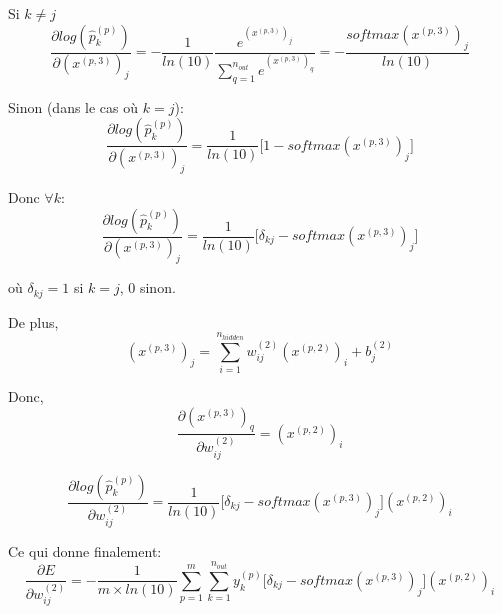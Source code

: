 \documentclass[a4paper,11pt,oneside,roman]{article}
\begin{document}
    Si $k \ne j$
    \begin{equation}
        \frac{\partial log(\hat{p}_{k}^{(p)})}{\partial (x^{(p,3)})_{j}} = -\frac{1}{ln(10)} \frac{e^{(x^{(p,3)})_j}}{\sum\limits_{q=1}^{n_{out}} e^{(x^{(p,3)})_q}} = -\frac{softmax(x^{(p,3)})_j}{ln(10)}
    \end{equation}

    Sinon (dans le cas où $k = j$):
    \begin{equation}
        \frac{\partial log(\hat{p}_{k}^{(p)})}{\partial (x^{(p,3)})_{j}} = \frac{1}{ln(10)} \bigg[ 1 - softmax(x^{(p,3)})_j \bigg]
    \end{equation}

    Donc $\forall k$:
    \begin{equation}
        \frac{\partial log(\hat{p}_{k}^{(p)})}{\partial (x^{(p,3)})_{j}} = \frac{1}{ln(10)} \bigg[ \delta_{kj} - softmax(x^{(p,3)})_j \bigg]
    \end{equation}
    
    où $ \delta_{kj} = 1$ si $k = j$, $0$ sinon.
    
    De plus,
    \begin{equation}
        (x^{(p,3)})_{j} = \sum\limits_{i=1}^{n_{hidden}} w_{ij}^{(2)}(x^{(p,2)})_i + b_j^{(2)}
    \end{equation}

    Donc,
    \begin{equation}
        \frac{\partial (x^{(p,3)})_{q}}{\partial w^{(2)}_{ij}} = (x^{(p,2)})_i
    \end{equation}

    \begin{equation}
        \frac{\partial log(\hat{p}_{k}^{(p)})}{\partial w^{(2)}_{ij}} = \frac{1}{ln(10)} \bigg[ \delta_{kj} - softmax(x^{(p,3)})_j \bigg] (x^{(p,2)})_{i}
    \end{equation}

    Ce qui donne finalement:
    \begin{equation}
        \frac{\partial E}{\partial w_{ij}^{(2)}} = -\frac{1}{m \times ln(10)} \sum\limits_{p=1}^{m} \sum\limits_{k=1}^{n_{out}} y_k^{(p)} \bigg[ \delta_{kj} - softmax(x^{(p,3)})_j \bigg] (x^{(p,2)})_{i}
    \end{equation}
\end{document}
